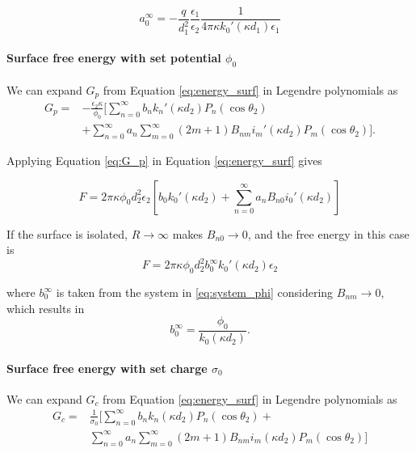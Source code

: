 \begin{equation} \label{eq:a0_inf}
a_0^{\infty} = -\frac{q}{d_1^2}\frac{\epsilon_1}{\epsilon_2} \frac{1}{4\pi\kappa k_0'(\kappa d_1) \epsilon_1}
\end{equation}


\medskip
\paragraph*{Surface  free energy with set potential $\phi_0$}
We can expand $G_p$ from Equation \eqref{eq:energy_surf} in Legendre polynomials as
%
\begin{align} \label{eq:G_p}
G_p = &-\frac{\epsilon_2 \kappa}{\phi_0}  \Bigg[ \sum_{n=0}^{\infty} b_n k_n'(\kappa d_2) P_n(\cos \theta_2) \nonumber \\ 
& + \sum_{n=0}^{\infty} a_n \sum_{m=0}^{\infty} (2m+1) B_{nm} i_m'(\kappa d_2) P_m(\cos \theta_2) \Bigg].
\end{align}

 \noindent Applying Equation \eqref{eq:G_p} in Equation \eqref{eq:energy_surf} gives

\begin{equation} \label{G_p_int}
F = 2\pi \kappa \phi_0 d_2^2 \epsilon_2 \left[ b_0 k_0'(\kappa d_2) + \sum_{n=0}^{\infty} a_n B_{n0} i_0'(\kappa d_2) \right]
\end{equation}

 \noindent If the surface is isolated, $R \to \infty$ makes $B_{n0} \to 0$, and the free energy in this case is 
%
\begin{equation} \label{energy_isolated_phi}
F = 2\pi \kappa \phi_0 d_2^2 b_0^{\infty} k_0'(\kappa d_2) \epsilon_2
\end{equation}
 
 \noindent where $b_0^{\infty}$ is taken from the system in  \eqref{eq:system_phi} considering $B_{nm} \to 0$, which results in
 \begin{equation} \label{b_inf_phi}
 b_0^{\infty} = \frac{\phi_0}{k_0(\kappa d_2)}.
 \end{equation}
 
 \medskip
 \paragraph*{Surface  free energy with set charge $\sigma_0$}
We can expand $G_c$ from Equation \eqref{eq:energy_surf} in Legendre polynomials as
%
\begin{align} \label{eq:G_c}
G_c = & \frac{1}{\sigma_0} \Bigg[ \sum_{n=0}^{\infty} b_n k_n(\kappa d_2) P_n(\cos \theta_2) + \nonumber \\ 
&\sum_{n=0}^{\infty} a_n \sum_{m=0}^{\infty} (2m+1) B_{nm} i_m(\kappa d_2) P_m(\cos \theta_2) \Bigg]
\end{align}

